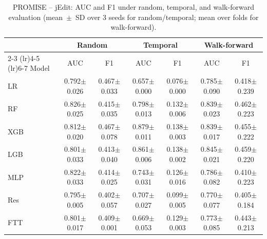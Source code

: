 \begin{table}[htbp]
\centering
\caption{PROMISE -- jEdit: AUC and F1 under random, temporal, and walk-forward evaluation (mean~$\pm$~SD over 3 seeds for random/temporal; mean over folds for walk-forward).}
\label{tab:supp-jedit}
\scriptsize
\begin{tabular}{l cc cc cc}
\toprule
 & \multicolumn{2}{c}{Random} & \multicolumn{2}{c}{Temporal} & \multicolumn{2}{c}{Walk-forward} \\
\cmidrule(lr){2-3} \cmidrule(lr){4-5} \cmidrule(lr){6-7}
Model & AUC & F1 & AUC & F1 & AUC & F1 \\
\midrule
LR & 0.792$\pm$0.026 & 0.467$\pm$0.033 & 0.657$\pm$0.000 & 0.076$\pm$0.000 & 0.785$\pm$0.090 & 0.418$\pm$0.239 \\
RF & 0.826$\pm$0.025 & 0.415$\pm$0.035 & 0.798$\pm$0.013 & 0.132$\pm$0.006 & 0.839$\pm$0.023 & 0.462$\pm$0.223 \\
XGB & 0.812$\pm$0.020 & 0.467$\pm$0.078 & 0.879$\pm$0.011 & 0.138$\pm$0.003 & 0.839$\pm$0.017 & 0.455$\pm$0.222 \\
LGB & 0.801$\pm$0.033 & 0.413$\pm$0.040 & 0.861$\pm$0.006 & 0.138$\pm$0.002 & 0.845$\pm$0.021 & 0.459$\pm$0.220 \\
MLP & 0.822$\pm$0.033 & 0.414$\pm$0.025 & 0.743$\pm$0.031 & 0.126$\pm$0.016 & 0.786$\pm$0.082 & 0.410$\pm$0.223 \\
Res & 0.795$\pm$0.005 & 0.402$\pm$0.057 & 0.707$\pm$0.027 & 0.099$\pm$0.005 & 0.770$\pm$0.077 & 0.405$\pm$0.184 \\
FTT & 0.801$\pm$0.017 & 0.409$\pm$0.001 & 0.669$\pm$0.053 & 0.129$\pm$0.003 & 0.773$\pm$0.085 & 0.443$\pm$0.213 \\
\bottomrule
\end{tabular}
\end{table}

